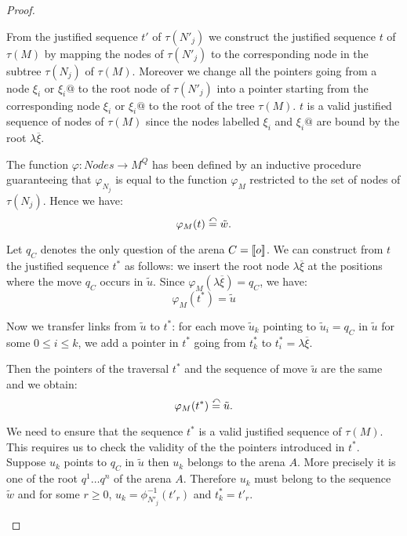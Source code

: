 \begin{proof}
\begin{itemize}
    From the justified sequence $t'$ of $\tau(N'_j)$ we construct the justified sequence $t$ of
    $\tau(M)$ by mapping the nodes of $\tau(N'_j)$ to the corresponding node in the subtree $\tau(N_j)$
    of $\tau(M)$. Moreover we change all the pointers going from a node $\xi_i$ or $\xi_i @$ to the root node of $\tau(N'_j)$
    into a pointer starting from the corresponding node $\xi_i$ or $\xi_i @$ to the root of the tree $\tau(M)$.
    $t$ is a valid justified sequence of nodes of $\tau(M)$ since the nodes labelled $\xi_i$ and $\xi_i @$
    are bound by the root $\lambda \overline{\xi}$.

    The function $\varphi : Nodes \rightarrow M^Q$ has been defined by an inductive procedure
    guaranteeing that $\varphi_{N_j}$ is equal to the function $\varphi_{M}$ restricted to
    the set of nodes of $\tau(N_j)$. Hence we have:
    \begin{equation}
    \varphi_{M}(t) \stackrel{\curvearrowleft}{=} \tilde{w}. \label{eq:def_t}
    \end{equation}

    Let $q_C$ denotes the only question of the arena $C = {[\![ o ]\!]}$.
    We can construct from $t$ the justified sequence $t^\ast$ as follows:
    we insert the root node $\lambda \overline{\xi}$ at the positions where the move $q_C$ occurs in $\tilde{u}$.
    Since $\varphi_{M}(\lambda \overline{\xi}) = q_C$, we have:
    $$\varphi_{M}(t^\ast) = \tilde{u}$$

    Now we transfer links from $\tilde{u}$ to $t^\ast$: for each
    move $\tilde{u}_k$ pointing to $\tilde{u}_i = q_C$ in $\tilde{u}$ for some $0 \leq i \leq k$,
    we add a pointer in $t^\ast$ going from $t^\ast_k$ to $t^\ast_i = \lambda \overline{\xi}$.

    Then the pointers of the traversal $t^\ast$ and the sequence of move $\tilde{u}$ are the same and we obtain:
    \begin{equation}
    \varphi_{M}(t^\ast) \stackrel{\curvearrowleft}{=} \tilde{u}. \label{eq:def_tstar}
    \end{equation}

    We need to ensure that the sequence $t^\ast$ is a valid justified sequence of $\tau(M)$.
    This requires us to check the validity of the the pointers introduced in $t^\ast$.
    Suppose $u_k$ points to $q_C$ in $\tilde{u}$ then $u_k$ belongs to the arena $A$. More precisely it is one
    of the root $q^1 \ldots q^n$ of the arena $A$. Therefore $u_k$ must belong to the sequence $\tilde{w}$ and
    for some $r \geq 0$, $u_k = \phi^{-1}_{N'_j}(t'_r)$ and $t^\ast_k = t'_r$.


\end{itemize}
\end{proof}
